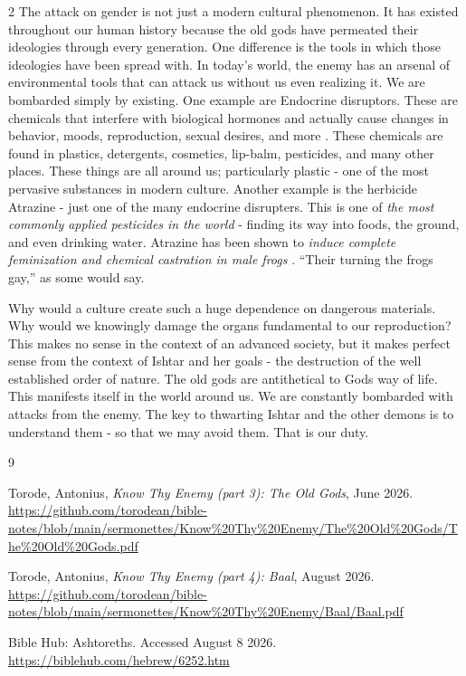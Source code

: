 \documentclass[10pt]{article}
\begin{document}
\begin{multicols}{2}
The attack on gender is not just a modern cultural phenomenon. It has existed throughout our human history because the old gods have permeated their ideologies through every generation. One difference is the tools in which those ideologies have been spread with. In today's world, the enemy has an arsenal of environmental tools that can attack us without us even realizing it. We are bombarded simply by existing. One example are Endocrine disruptors. These are chemicals that interfere with biological hormones and actually cause changes in behavior, moods, reproduction, sexual desires, and more \cite{endocrine}. These chemicals are found in plastics, detergents, cosmetics, lip-balm, pesticides, and many other places. These things are all around us; particularly plastic - one of the most pervasive substances in modern culture. Another example is the herbicide Atrazine - just one of the many endocrine disrupters. This is one of \textit{the most commonly applied pesticides in the world} - finding its way into foods, the ground, and even drinking water. Atrazine has been shown to \textit{induce complete feminization and chemical castration in male frogs} \cite{gay frogs}. ``Their turning the frogs gay,'' as some would say.

Why would a culture create such a huge dependence on dangerous materials. Why would we knowingly damage the organs fundamental to our reproduction? This makes no sense in the context of an advanced society, but it makes perfect sense from the context of Ishtar and her goals - the destruction of the well established order of nature. The old gods are antithetical to Gods way of life. This manifests itself in the world around us. We are constantly bombarded with attacks from the enemy. The key to thwarting Ishtar and the other demons is to understand them - so that we may avoid them. That is our duty.



\begin{thebibliography}{9}
{\footnotesize
	
	 Torode, Antonius, \textit{Know Thy Enemy (part 3): The Old Gods}, June 2026.  \url{https://github.com/torodean/bible-notes/blob/main/sermonettes/Know%20Thy%20Enemy/The%20Old%20Gods/The%20Old%20Gods.pdf}
		
	 Torode, Antonius, \textit{Know Thy Enemy (part 4): Baal}, August 2026.  \url{https://github.com/torodean/bible-notes/blob/main/sermonettes/Know%20Thy%20Enemy/Baal/Baal.pdf}
	
	 Bible Hub: Ashtoreths. Accessed August 8 2026. \url{https://biblehub.com/hebrew/6252.htm}
	
}
\end{thebibliography}
\end{multicols}
\end{document}
